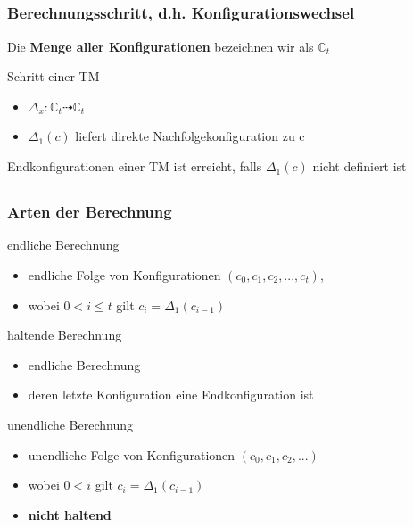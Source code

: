 \subsection*{}
\begin{frame}
  \frametitle{Berechnungsschritt, d.h. Konfigurationswechsel}
  \pause
  Die \textbf{Menge aller Konfigurationen} bezeichnen wir als $\mathbb{C}_t$
  \pause
  \begin{block}{Schritt einer TM}
\begin{itemize}
	\item   $\Delta_x : \mathbb{C}_t \dashrightarrow  \mathbb{C}_t$
  \item		$\Delta_1(c)$ liefert direkte Nachfolgekonfiguration zu c
\end{itemize}
  \end{block}
  \pause
    \begin{block}{Endkonfigurationen einer TM}
  ist erreicht, falls $\Delta_1(c)$ nicht definiert ist
  \end{block}
\end{frame}

\subsection*{}
\begin{frame}
  \frametitle{Arten der Berechnung}

  \pause
  \begin{block}{endliche Berechnung}
\begin{itemize}
	\item endliche Folge von Konfigurationen $(c_0, c_1, c_2, . . . , c_t )$,
	\item wobei $0 < i \leq t$ gilt  $c_i = \Delta_1(c_{i-1})$
\end{itemize}
  \end{block}

  \pause
  \begin{block}{haltende Berechnung}
\begin{itemize}
	\item endliche Berechnung
	\item deren letzte Konfiguration eine Endkonfiguration ist
\end{itemize}
  \end{block}

  \pause
  \begin{block}{unendliche Berechnung}
\begin{itemize}
	\item unendliche Folge von Konfigurationen $(c_0, c_1, c_2, . . . )$
	\item wobei $0 < i$ gilt  $c_i = \Delta_1(c_{i-1})$
	\item \textbf{nicht haltend}
\end{itemize}
  \end{block}
\end{frame}

